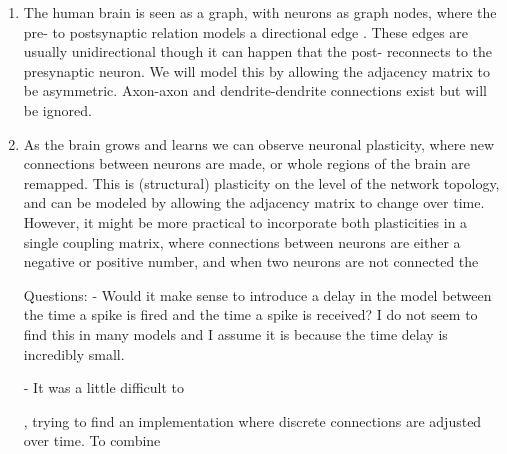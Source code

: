 \begin{enumerate}
\item The human brain is seen as a graph, with neurons as graph nodes, where the pre- to postsynaptic relation models a directional edge \cite{Bullmore2010}. These edges are usually unidirectional though it can happen that the post- reconnects to the presynaptic neuron. We will model this by allowing the adjacency matrix to be asymmetric. Axon-axon and dendrite-dendrite connections exist but will be ignored. \cite{Didier1997} 

\item As the brain grows and learns we can observe neuronal plasticity, where new connections between neurons are made, or whole regions of the brain are remapped. This is (structural) plasticity on the level of the network topology, and can be modeled by allowing the adjacency matrix to change over time.
However, it might be more practical to incorporate both plasticities in a single coupling matrix, where connections between neurons are either a negative or positive number, and when two neurons are not connected the

Questions:
- Would it make sense to introduce a delay in the model between the time a spike is fired and the time a spike is received? I do not seem to find this in many models and I assume it is because the time delay is incredibly small.

- It was a little difficult to 


, trying to find an implementation where discrete connections are adjusted over time. To combine 

\end{enumerate}



\small{}


